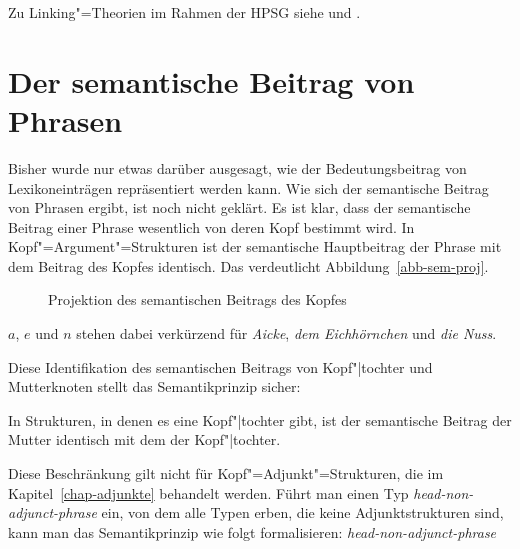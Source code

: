 Zu Linking"=Theorien im Rahmen der HPSG siehe  und .

\section{Der semantische Beitrag von Phrasen}
\label{sec-semp-i}

Bisher wurde nur etwas darüber ausgesagt, wie der Bedeutungsbeitrag von Lexikoneinträgen repräsentiert
werden kann. Wie sich der semantische Beitrag von Phrasen ergibt, ist noch nicht geklärt.
Es ist klar, dass der semantische Beitrag einer Phrase wesentlich von deren Kopf bestimmt
wird. In Kopf"=Argument"=Strukturen ist der semantische Hauptbeitrag der Phrase mit dem
Beitrag des Kopfes identisch. Das verdeutlicht Abbildung~\vref{abb-sem-proj}.
\begin{figure}
\centering%
\caption{\label{abb-sem-proj}Projektion des semantischen Beitrags des Kopfes}
\end{figure}
$a$, $e$ und $n$ stehen dabei verkürzend für \emph{Aicke}, \emph{dem Eichhörnchen} und \emph{die Nuss}.

Diese Identifikation des semantischen Beitrags von Kopf"|tochter und Mutterknoten
stellt das Semantikprinzip sicher:
%
\begin{prinzip-break}
\label{semp-i}
In Strukturen, in denen es eine Kopf"|tochter gibt, ist der
semantische Beitrag der Mutter identisch mit dem der Kopf"|tochter.
\end{prinzip-break}
Diese Beschränkung gilt nicht für Kopf"=Adjunkt"=Strukturen, 
die im Kapitel~\ref{chap-adjunkte} behandelt werden.
Führt man einen Typ \textit{head-non-adjunct-phrase} ein, von dem alle Typen
erben, die keine Adjunktstrukturen sind, kann man das Semantikprinzip wie folgt formalisieren:
\ea
\textit{head-non-adjunct-phrase} \impl
{}
\z

